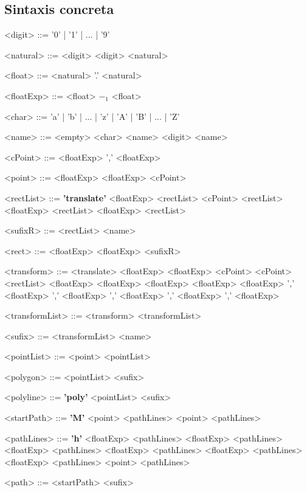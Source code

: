 \documentclass[a4paper,10pt]{article}
\begin{document}
\subsection*{Sintaxis concreta}

\begin{grammar}
<digit> ::= '0' | '1' | ... | '9'

<natural> ::= <digit>
    \alt <digit> <natural>

<float> ::= <natural> '.' <natural>

<floatExp> ::= <float>
    \alt $-_{1}$ <float>

<char> ::= 'a' | 'b' | ... | 'z' | 'A' | 'B' | ... | 'Z'

<name> ::= <empty>
    \alt <char> <name>
    \alt <digit> <name>

<cPoint> ::= <floatExp> ',' <floatExp>

<point> ::= <floatExp> <floatExp>
    \alt <cPoint>

<rectList> ::= {\bfseries 'translate'} <floatExp> <rectList>
     <cPoint> <rectList>
     <floatExp> <rectList>
     <floatExp> <rectList>
    \alt

<sufixR> ::= <rectList> <name>

<rect> ::= <floatExp> <floatExp> <sufixR>

<transform> ::= <translate> <floatExp>
     <floatExp> <cPoint>
     <cPoint> <rectList>
     <floatExp>
     <floatExp>
     <floatExp>
     <floatExp>
     <floatExp> ',' <floatExp> ',' <floatExp> ',' <floatExp> ',' <floatExp> ',' <floatExp>

<transformList> ::= <transform> <transformList>
    \alt

<sufix> ::= <transformList> <name>

<pointList> ::= <point> <pointList>
    \alt

<polygon> ::= <pointList> <sufix>

<polyline> ::= {\bfseries 'poly'} <pointList> <sufix>

<startPath> ::= {\bfseries 'M'} <point> <pathLines>
     <point> <pathLines>

<pathLines> ::= {\bfseries 'h'} <floatExp> <pathLines>
     <floatExp> <pathLines>
     <floatExp> <pathLines>
     <floatExp> <pathLines>
     <floatExp> <pathLines>
     <floatExp> <pathLines>
    \alt <point> <pathLines>

<path> ::= <startPath> <sufix>
\end{grammar}
\end{document}

